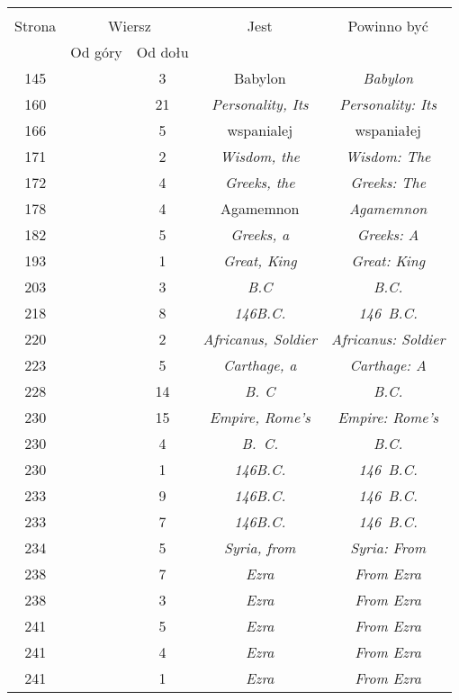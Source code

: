 \documentclass[a4paper,11pt]{article}
\begin{document}
\begin{center}
  \begin{tabular}{|c|c|c|c|c|}
    \hline
    & \multicolumn{2}{c|}{} & & \\
    Strona & \multicolumn{2}{c|}{Wiersz} & Jest
                              & Powinno być \\ \cline{2-3}
    & Od góry & Od dołu & & \\
    \hline
    145 & &  3 & Babylon & \emph{Babylon} \\
    160 & & 21 & \emph{Personality, Its} & \emph{Personality: Its} \\
    166 & &  5 & wspanialej & wspaniałej \\
    171 & &  2 & \emph{Wisdom, the} & \emph{Wisdom: The} \\
    172 & &  4 & \emph{Greeks, the} & \emph{Greeks: The} \\
    178 & &  4 & Agamemnon & \emph{Agamemnon} \\
    182 & &  5 & \emph{Greeks, a} & \emph{Greeks: A} \\
    193 & &  1 & \emph{Great, King} & \emph{Great: King} \\
    203 & &  3 & \emph{B.C} & \emph{B.C.} \\
    218 & &  8 & \emph{146B.C.} & \emph{146~B.C.} \\
    220 & &  2 & \emph{Africanus, Soldier} & \emph{Africanus: Soldier} \\
    223 & &  5 & \emph{Carthage, a} & \emph{Carthage: A} \\
    228 & & 14 & \emph{B. C} & \emph{B.C.} \\
    230 & & 15 & \emph{Empire, Rome's} & \emph{Empire: Rome's} \\
    230 & &  4 & \emph{B.~C.} & \emph{B.C.} \\
    230 & &  1 & \emph{146B.C.} & \emph{146~B.C.} \\
    233 & &  9 & \emph{146B.C.} & \emph{146~B.C.} \\
    233 & &  7 & \emph{146B.C.} & \emph{146~B.C.} \\
    234 & &  5 & \emph{Syria, from} & \emph{Syria: From} \\
    238 & &  7 & \emph{Ezra} & \emph{From Ezra} \\
    238 & &  3 & \emph{Ezra} & \emph{From Ezra} \\
    241 & &  5 & \emph{Ezra} & \emph{From Ezra} \\
    241 & &  4 & \emph{Ezra} & \emph{From Ezra} \\
    241 & &  1 & \emph{Ezra} & \emph{From Ezra} \\

\end{tabular}
\end{center}
\end{document}
